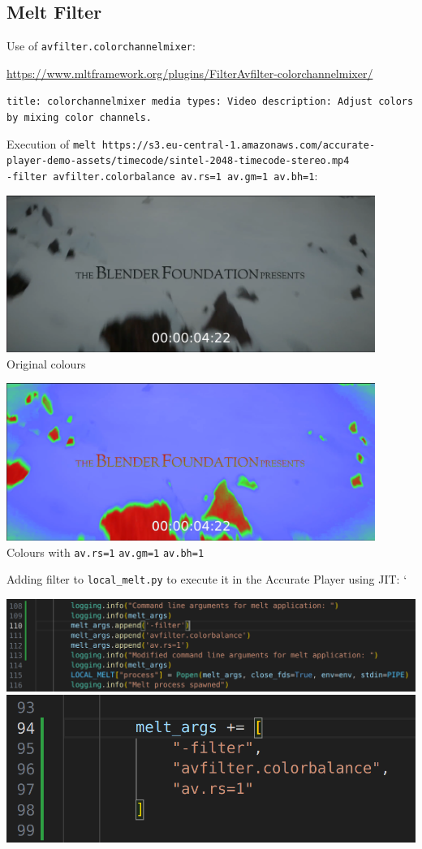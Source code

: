 \documentclass[../MasterThesis.tex]{subfiles}
\begin{document}
\subsection{Melt Filter} \label{subsection:meltfilter}


Use of \texttt{avfilter.colorchannelmixer}:

\url{https://www.mltframework.org/plugins/FilterAvfilter-colorchannelmixer/}

\texttt{title: colorchannelmixer \newline
	media types: Video \newline
	description: Adjust colors by mixing color channels.}

Execution of \texttt{melt https://s3.eu-central-1.amazonaws.com/accurate-player\--demo-assets/timecode/sintel-2048-timecode-stereo.mp4 \\ -filter avfilter.colorbalance av.rs=1 av.gm=1 av.bh=1}:


\begin{minipage}{0.5\textwidth}
	\includegraphics[width=0.9\textwidth]{colourdefault.png}
	Original colours
\end{minipage}\begin{minipage}{0.5\textwidth}
	\includegraphics[width=0.9\textwidth]{colourhigh.png}
	Colours with \texttt{av.rs=1} \texttt{av.gm=1} \texttt{av.bh=1}
\end{minipage}

Adding filter to \texttt{local\_melt.py} to execute it in the Accurate Player using JIT:
`
\begin{center}
	\includegraphics[height=0.13\textwidth]{code.png}
	\includegraphics[height=0.13\textwidth]{codecleaner.png}
\end{center}
\end{document}
